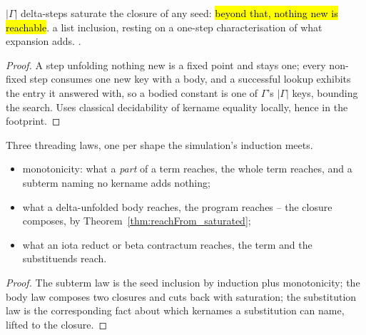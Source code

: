 \begin{theorem}
\label{thm:reachFrom_saturated}
\leanok
{}
 $|\Gamma|$ delta-steps saturate the closure of any seed: \hl{beyond that, nothing new
is reachable}.
 a list inclusion, resting on a one-step characterisation of what expansion adds.
 \stProved{}.
\end{theorem}
\begin{proof}
\leanok
{}
 A step unfolding nothing new is a fixed point and stays one; every non-fixed step consumes
one new key with a body, and a successful lookup exhibits the entry it answered with, so a bodied
constant is one of $\Gamma$'s $|\Gamma|$ keys, bounding the search. Uses classical decidability of
kername equality locally, hence  in the footprint.
\end{proof}

\begin{lemma}
\label{lem:ReachableFrom-through_body}
\leanok
{}
 Three threading laws, one per shape the simulation's induction meets.
\begin{itemize}
\item monotonicity: what a \emph{part} of a term reaches, the whole term reaches, and a subterm naming
no kername adds nothing;
\item what a delta-unfolded body reaches, the program reaches -- the closure composes, by
Theorem~\ref{thm:reachFrom_saturated};
\item what an iota reduct or beta contractum reaches, the term and the substituends reach.
\end{itemize}
\end{lemma}
\begin{proof}
\leanok
{}
 The subterm law is the seed inclusion by induction plus monotonicity; the body law composes
two closures and cuts back with saturation; the substitution law is the corresponding fact about which
kernames a substitution can name, lifted to the closure.
\end{proof}

